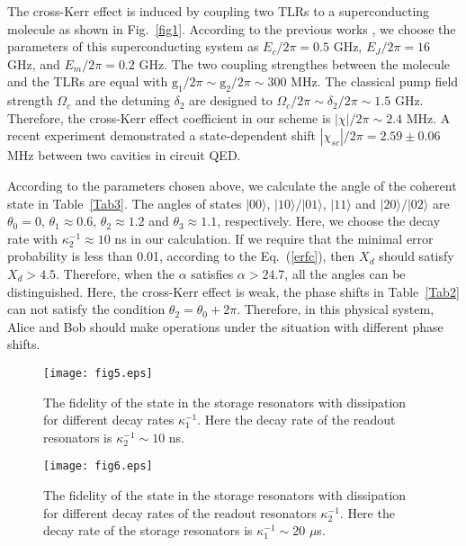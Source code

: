\documentclass[showpacs,aps,graphicx,twocolumn]{revtex4}
\begin{document}
The cross-Kerr effect is induced by coupling two TLRs to a
superconducting molecule as shown in Fig.~\ref{fig1}. According to
the previous works \cite{HZhangPRA2017,YHu}, we choose the
parameters of this superconducting system as  $E_{c}/2\pi=0.5$ GHz,
$E_{J}/2\pi=16$ GHz, and $E_{m}/2\pi=0.2$ GHz. The two coupling
strengthes between the molecule and the TLRs are equal with
$\text{g}_{1}/2\pi\sim\text{g}_{2}/2\pi\sim 300$ MHz. The classical
pump field strength $\Omega_{c}$ and the detuning $\delta_{2}$ are
designed to $\Omega_{c}/2\pi\sim\delta_{2}/2\pi\sim 1.5$ GHz.
Therefore, the cross-Kerr effect coefficient in our scheme is
$|\chi|/2\pi\sim 2.4$ MHz. A recent experiment \cite{ETHolland}
demonstrated a state-dependent shift $|\chi_{sc}|/2\pi=2.59\pm 0.06$
MHz between two cavities in circuit QED.


According to the parameters chosen above, we calculate the angle of
the coherent state in Table~\ref{Tab3}. The angles of states
$|00\rangle$, $|10\rangle/|01\rangle$, $|11\rangle$ and
$|20\rangle/|02\rangle$ are $\theta_{0}=0$, $\theta_{1}\approx 0.6$,
$\theta_{2}\approx 1.2$ and $\theta_{3}\approx 1.1$, respectively.
Here, we choose the decay rate with $\kappa_{2}^{-1}\approx 10$ ns in our calculation.
If we require that the minimal error probability is less than 0.01,
according to the Eq.~(\ref{erfc}), then $X_{d}$ should satisfy
$X_{d}>4.5$. Therefore, when the $\alpha$ satisfies $\alpha>24.7$,
all the angles can be distinguished.  Here, the cross-Kerr effect is
weak, the phase shifts in Table~\ref{Tab2} can not satisfy the
condition $\theta_{2}=\theta_{0}+2\pi$. Therefore, in this physical
system, Alice and Bob should make operations under the situation
with different phase shifts.


\begin{figure}[!ht]%
\begin{center}
\texttt{[image: fig5.eps]}
\caption{ The fidelity of the state in the storage resonators with dissipation for different decay rates
$\kappa_{1}^{-1}$. Here the decay rate of the readout resonators is
$\kappa_{2}^{-1}\sim 10$ ns.} \label{figka1}
\end{center}
\end{figure}


\begin{figure}[!ht]%
\begin{center}
\texttt{[image: fig6.eps]}
\caption{ The fidelity of the state in the storage resonators with dissipation for
different decay rates of the readout resonators $\kappa_{2}^{-1}$. Here the decay rate of the
storage resonators is $\kappa_{1}^{-1}\sim 20$ $\mu$s.} \label{figka2}
\end{center}
\end{figure}
\end{document}

